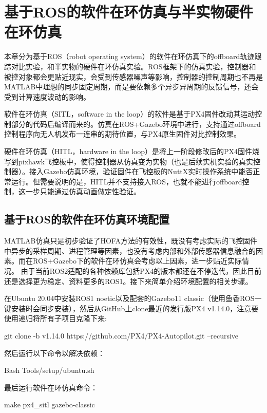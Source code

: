 \chapter{基于ROS的软件在环仿真与半实物硬件在环仿真}
本章分为基于ROS（robot operating system）的软件在环仿真下的offboard轨迹跟踪对比实验，和半实物的硬件在环仿真实验。ROS框架下的仿真实验，控制器和被控对象都会更贴近现实，会受到传感器噪声等影响，控制器的控制周期也不再是MATLAB中理想的同步固定周期，而是要依赖多个异步异周期的反馈信号，还会受到计算速度波动的影响。

软件在环仿真（SITL，software in the loop）的软件是基于PX4固件改动其运动控制部分的代码后编译而来的。仿真在ROS+Gazebo环境中进行，支持通过offboard控制程序向无人机发布一连串的期待位置，与PX4原生固件对比控制效果。

硬件在环仿真（HITL，hardware in the loop）是将上一阶段修改后的PX4固件烧写到pixhawk飞控板中，使得控制器从仿真变为实物（也是后续实机实验的真实控制器）。接入Gazebo仿真环境，验证固件在飞控板的NuttX实时操作系统中能否正常运行。但需要说明的是，HITL并不支持接入ROS，也就不能进行offboard控制，这一步只能通过仿真动画做定性验证。

\section{基于ROS的软件在环仿真环境配置}
MATLAB仿真只是初步验证了HOFA方法的有效性，既没有考虑实际的飞控固件中异步的采样周期、进程管理等因素，也没有考虑内部和外部传感器信息融合的因素。而在ROS+Gazebo下的软件在环仿真会考虑以上因素，进一步贴近实际情况。
由于当前ROS2适配的各种依赖库包括PX4的版本都还在不停迭代，因此目前还是选择更为稳定、资料更多的ROS1。接下来简单介绍环境配置的相关步骤。

在Ubuntu 20.04中安装ROS1 noetic以及配套的Gazebo11 classic（使用鱼香ROS一键安装\footnotemark[1]时会同步安装），然后从GitHub上clone最近的发行版PX4 v1.14.0，注意要使用递归将所有子项目克隆下来:
\begin{codeblock}[language=C]
  git clone -b v1.14.0 https://github.com/PX4/PX4-Autopilot.git --recursive
\end{codeblock}
然后运行以下命令以解决依赖：
\begin{codeblock}[language=C]
  Bash Tools/setup/ubuntu.sh
\end{codeblock}
最后运行软件在环仿真命令：
\begin{codeblock}[language=C]
  make px4_sitl gazebo-classic
\end{codeblock}

